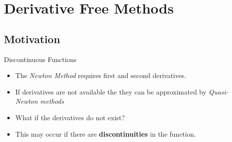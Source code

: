\documentclass[10pt]{beamer}
\begin{document}
                                                                                              \section{Derivative Free Methods}
                                                                                              \subsection{Motivation}
                                                                                              \begin{frame}{Discontinuous Functions}
                                                                                                \begin{itemize}
                                                                                                \item The {\em Newton Method} requires first and second derivatives.

                                                                                                \item If derivatives are not available the they can be approximated by {\em Quasi-Newton methods}

                                                                                                \item What if the derivatives do not exist?

                                                                                                \item This may occur if there are {\bf discontinuities} in the function.
                                                                                                \end{itemize}
                                                                                              \end{frame}
\end{document}
